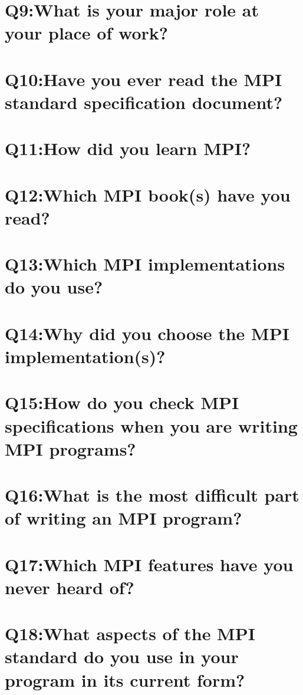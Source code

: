\documentclass{report}
\begin{document}
\clearpage
\section{Q9:What is your major role at your place of work?}


\clearpage
\section{Q10:Have you ever read the MPI standard specification document?}


\clearpage
\section{Q11:How did you learn MPI?}


\clearpage
\section{Q12:Which MPI book(s) have you read?}


\clearpage
\section{Q13:Which MPI implementations do you use?}


\clearpage
\section{Q14:Why did you choose the MPI implementation(s)?}


\clearpage
\section{Q15:How do you check MPI specifications when you are writing MPI programs?}


\clearpage
\section{Q16:What is the most difficult part of writing an MPI program?}


\clearpage
\section{Q17:Which MPI features have you never heard of?}


\clearpage
\section{Q18:What aspects of the MPI standard do you use in your program in its current form?}

\end{document}
